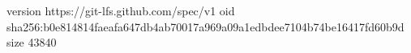 version https://git-lfs.github.com/spec/v1
oid sha256:b0e814814faeafa647db4ab70017a969a09a1edbdee7104b74be16417fd60b9d
size 43840
